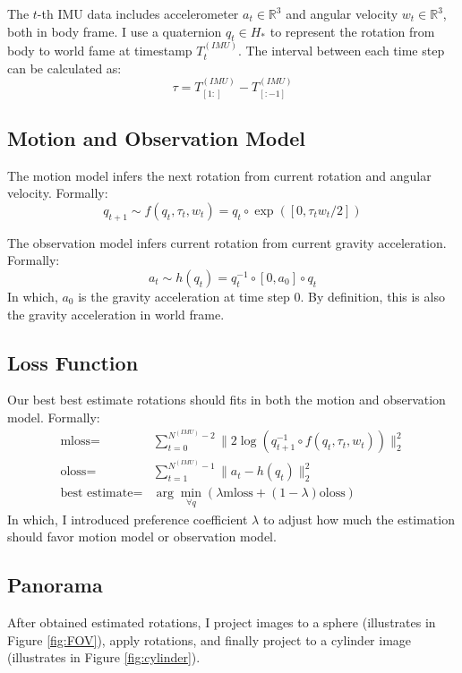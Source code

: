 \documentclass[conference]{IEEEtran}
\begin{document}
The $t$-th IMU data includes accelerometer $a_t \in \mathbb{R}^3$ and 
angular velocity $ w_t \in \mathbb{R}^3$, both in body frame.
I use a quaternion $q_t \in H_*$ to represent the rotation from body to
world fame at timestamp $T^{(IMU)}_{t} $.
The interval between each time step can be calculated as: 
$$\tau = T^{(IMU)}_{[1:]} - T^{(IMU)}_{[:-1]}$$


\subsection{Motion and Observation Model}

The motion model infers the next rotation from current rotation and angular velocity.
Formally:
$$q_{t+1} \sim f(q_t, \tau_t, w_t) = q_t \circ \exp([0, \tau_t w_t/2])$$

The observation model infers current rotation from current gravity acceleration.
Formally:
$$a_t \sim h(q_t) = q_t^{-1} \circ [0, a_0] \circ q_t$$
In which, $a_0$ is the gravity acceleration at time step 0. By definition, 
this is also the gravity acceleration in world frame.

\subsection{Loss Function}

Our best best estimate rotations should fits in both the motion and observation model.
Formally:
$$
\begin{aligned}
    \text{mloss} =&\sum^{N^{(IMU)}-2}_{t=0} \| 2\log \left( q^{-1}_{t+1}\circ f\left( q_{t},\tau_{t} ,w_{t}\right)  \right)  \|^{2}_{2} \\ 
    \text{oloss} =&\sum^{N^{(IMU)}-1}_{t=1} \| a_{t}-h(q_{t})\|^{2}_{2} \\ 
    \text{best estimate} =&\arg \min_{\forall q} \left( \lambda \text{mloss} + (1-\lambda)\text{oloss} \right)  
\end{aligned} 
$$
In which, I introduced preference coefficient $\lambda$ to adjust how much the estimation
should favor motion model or observation model.

\subsection{Panorama}
After obtained estimated rotations, I project images to a sphere (illustrates in Figure \ref*{fig:FOV}), apply rotations, 
and finally project to a cylinder image (illustrates in Figure \ref*{fig:cylinder}).
\end{document}
